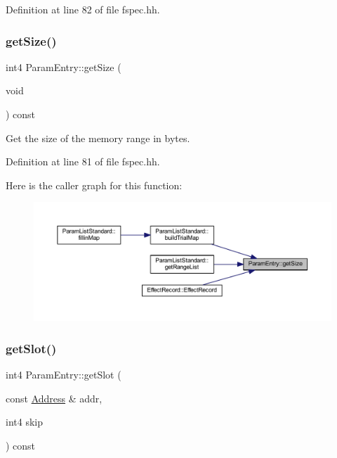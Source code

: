Definition at line 82 of file fspec.\+hh.

\mbox{\label{class_param_entry_a14b9358afc509b2d9df494ea6ecfbe31}} 
\subsubsection{\texorpdfstring{getSize()}{getSize()}}
{\footnotesize\ttfamily int4 Param\+Entry\+::get\+Size (\begin{DoxyParamCaption}\item[{void}]{ }\end{DoxyParamCaption}) const\hspace{0.3cm}{\ttfamily [inline]}}



Get the size of the memory range in bytes. 



Definition at line 81 of file fspec.\+hh.

Here is the caller graph for this function\+:
\nopagebreak
\begin{figure}[H]
\begin{center}
\leavevmode
\includegraphics[width=350pt]{class_param_entry_a14b9358afc509b2d9df494ea6ecfbe31_icgraph}
\end{center}
\end{figure}
\mbox{\label{class_param_entry_af5f3ce2b0cce7b2400a14ab3abc37cd9}} 
\subsubsection{\texorpdfstring{getSlot()}{getSlot()}}
{\footnotesize\ttfamily int4 Param\+Entry\+::get\+Slot (\begin{DoxyParamCaption}\item[{const \mbox{\hyperlink{class_address}{Address}} \&}]{addr,  }\item[{int4}]{skip }\end{DoxyParamCaption}) const}



